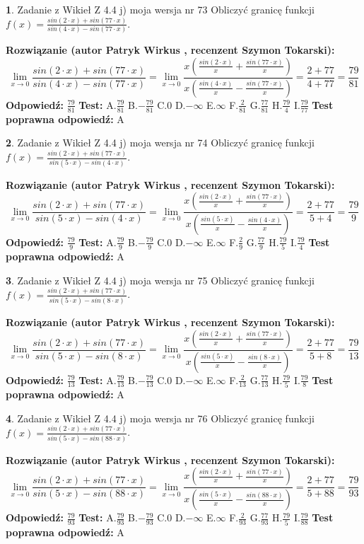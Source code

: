 \documentclass[12pt, a4paper]{article}
\theoremstyle{definition} %
\newtheorem{zad}{}
\newcommand{\zadStart}[1]{\begin{zad}#1\newline}
\newcommand{\zadStop}{\end{zad}}
\newcommand{\rozwStart}[2]{\noindent \textbf{Rozwiązanie (autor #1 , recenzent #2): }\newline}
\newcommand{\rozwStop}{\newline}
\newcommand{\odpStart}{\noindent \textbf{Odpowiedź:}\newline}
\newcommand{\odpStop}{\newline}
\newcommand{\testStart}{\noindent \textbf{Test:}\newline}
\newcommand{\testStop}{\newline}
\newcommand{\kluczStart}{\noindent \textbf{Test poprawna odpowiedź:}\newline}
\newcommand{\kluczStop}{\newline}
\begin{document}
\zadStart{Zadanie z Wikieł Z 4.4 j) moja wersja nr 73}
Obliczyć granicę funkcji $f(x)=\frac{sin(2\cdot x) +sin(77\cdot x)}{sin(4\cdot x) -sin(77\cdot x)}$.
\zadStop
\rozwStart{Patryk Wirkus}{Szymon Tokarski}
$$\lim\limits_{x\to 0}\frac{sin(2\cdot x) +sin(77\cdot x)}{sin(4\cdot x) -sin(77\cdot x)}=\lim\limits_{x\to 0}\frac{x(\frac{sin(2\cdot x)}{x}+\frac{sin(77\cdot x)}{x})}{x(\frac{sin(4\cdot x)}{x}-\frac{sin(77\cdot x)}{x})}=\frac{2+77}{4+77} = \frac{79}{81}$$
\rozwStop
\odpStart
$\frac{79}{81}$
\odpStop
\testStart
A.$\frac{79}{81}$
B.$-\frac{79}{81}$
C.$0$
D.$-\infty$
E.$\infty$
F.$\frac{2}{81}$
G.$\frac{77}{81}$
H.$\frac{79}{4}$
I.$\frac{79}{77}$
\testStop
\kluczStart
A
\kluczStop



\zadStart{Zadanie z Wikieł Z 4.4 j) moja wersja nr 74}
Obliczyć granicę funkcji $f(x)=\frac{sin(2\cdot x) +sin(77\cdot x)}{sin(5\cdot x) -sin(4\cdot x)}$.
\zadStop
\rozwStart{Patryk Wirkus}{Szymon Tokarski}
$$\lim\limits_{x\to 0}\frac{sin(2\cdot x) +sin(77\cdot x)}{sin(5\cdot x) -sin(4\cdot x)}=\lim\limits_{x\to 0}\frac{x(\frac{sin(2\cdot x)}{x}+\frac{sin(77\cdot x)}{x})}{x(\frac{sin(5\cdot x)}{x}-\frac{sin(4\cdot x)}{x})}=\frac{2+77}{5+4} = \frac{79}{9}$$
\rozwStop
\odpStart
$\frac{79}{9}$
\odpStop
\testStart
A.$\frac{79}{9}$
B.$-\frac{79}{9}$
C.$0$
D.$-\infty$
E.$\infty$
F.$\frac{2}{9}$
G.$\frac{77}{9}$
H.$\frac{79}{5}$
I.$\frac{79}{4}$
\testStop
\kluczStart
A
\kluczStop



\zadStart{Zadanie z Wikieł Z 4.4 j) moja wersja nr 75}
Obliczyć granicę funkcji $f(x)=\frac{sin(2\cdot x) +sin(77\cdot x)}{sin(5\cdot x) -sin(8\cdot x)}$.
\zadStop
\rozwStart{Patryk Wirkus}{Szymon Tokarski}
$$\lim\limits_{x\to 0}\frac{sin(2\cdot x) +sin(77\cdot x)}{sin(5\cdot x) -sin(8\cdot x)}=\lim\limits_{x\to 0}\frac{x(\frac{sin(2\cdot x)}{x}+\frac{sin(77\cdot x)}{x})}{x(\frac{sin(5\cdot x)}{x}-\frac{sin(8\cdot x)}{x})}=\frac{2+77}{5+8} = \frac{79}{13}$$
\rozwStop
\odpStart
$\frac{79}{13}$
\odpStop
\testStart
A.$\frac{79}{13}$
B.$-\frac{79}{13}$
C.$0$
D.$-\infty$
E.$\infty$
F.$\frac{2}{13}$
G.$\frac{77}{13}$
H.$\frac{79}{5}$
I.$\frac{79}{8}$
\testStop
\kluczStart
A
\kluczStop



\zadStart{Zadanie z Wikieł Z 4.4 j) moja wersja nr 76}
Obliczyć granicę funkcji $f(x)=\frac{sin(2\cdot x) +sin(77\cdot x)}{sin(5\cdot x) -sin(88\cdot x)}$.
\zadStop
\rozwStart{Patryk Wirkus}{Szymon Tokarski}
$$\lim\limits_{x\to 0}\frac{sin(2\cdot x) +sin(77\cdot x)}{sin(5\cdot x) -sin(88\cdot x)}=\lim\limits_{x\to 0}\frac{x(\frac{sin(2\cdot x)}{x}+\frac{sin(77\cdot x)}{x})}{x(\frac{sin(5\cdot x)}{x}-\frac{sin(88\cdot x)}{x})}=\frac{2+77}{5+88} = \frac{79}{93}$$
\rozwStop
\odpStart
$\frac{79}{93}$
\odpStop
\testStart
A.$\frac{79}{93}$
B.$-\frac{79}{93}$
C.$0$
D.$-\infty$
E.$\infty$
F.$\frac{2}{93}$
G.$\frac{77}{93}$
H.$\frac{79}{5}$
I.$\frac{79}{88}$
\testStop
\kluczStart
A
\kluczStop
\end{document}
